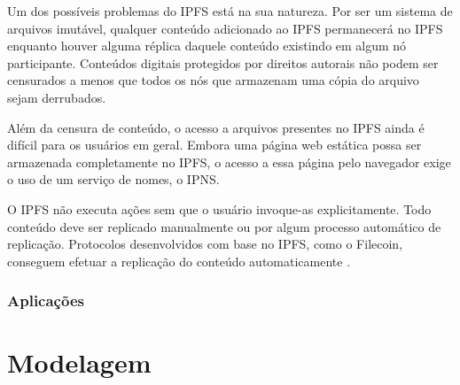 \documentclass[tcc,capa]{texufpel}
\begin{document}
    Um dos possíveis problemas do IPFS está na sua natureza. Por ser um sistema de arquivos imutável, qualquer conteúdo adicionado ao IPFS permanecerá no IPFS enquanto houver alguma réplica daquele conteúdo existindo em algum nó participante. Conteúdos digitais protegidos por direitos autorais não podem ser censurados a menos que todos os nós que armazenam uma cópia do arquivo sejam derrubados.
    
    Além da censura de conteúdo, o acesso a arquivos presentes no IPFS ainda é difícil para os usuários em geral. Embora uma página web estática possa ser armazenada completamente no IPFS, o acesso a essa página pelo navegador exige o uso de um serviço de nomes, o IPNS.
    
    O IPFS não executa ações sem que o usuário invoque-as explicitamente. Todo conteúdo deve ser replicado manualmente ou por algum processo automático de replicação. Protocolos desenvolvidos com base no IPFS, como o Filecoin, conseguem efetuar a replicação do conteúdo automaticamente \cite{jbenet47issue}.
        
    \subsection{Aplicações}




\chapter{Modelagem}






\end{document}
